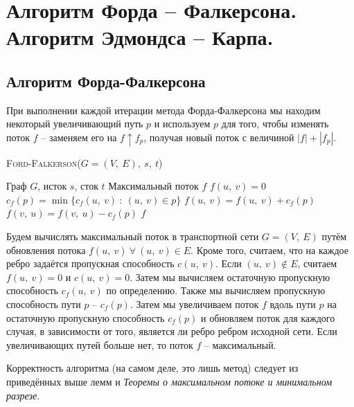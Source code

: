 \documentclass[a4paper,12pt]{article}
\newcommand{\algname}[1]{\textsc{#1}}
\begin{document}
\section{ Алгоритм Форда – Фалкерсона. Алгоритм Эдмондса – Карпа.}

\subsection{Алгоритм Форда-Фалкерсона}

При выполнении каждой итерации метода Форда-Фалкерсона мы находим некоторый увеличивающий путь $p$ и используем $p$ для того, чтобы изменять поток $f$ -- заменяем его на $f\uparrow f_p$, получая новый поток с величиной $|f| + |f_p|$.

\begin{algorithm}
  	\caption{\algname{Ford-Falkerson}($G = (V,\ E),\ s,\ t$)}
	\begin{algorithmic}
	    \Require Граф $G$, исток $s$, сток $t$
	    \Ensure Максимальный поток $f$
	    \State 
	        \State $f(u,\ v) = 0$
	    \EndFor
	        \State $c_f(p) = \min\{c_f(u,\ v)\ :\ (u,\ v) \in p\}$
	                \State $f(u,\ v) = f(u,\ v) + c_f(p)$
	            \Else
	                \State $f(v,\ u) = f(v,\ u) - c_f(p)$
	            \EndIf
	       \EndFor
	    \EndWhile
	    \State \Return $f$
	\end{algorithmic}
\end{algorithm}

Будем вычислять максимальный поток в транспортной сети $G = (V,\ E)$ путём обновления потока $f(u,\ v)\ \forall\ (u,\ v) \in E$. Кроме того, считаем, что на каждое ребро задаётся пропускная способность $c(u,\ v)$. Если $(u,\ v) \notin E$, считаем $f(u,\ v) = 0$ и $c(u,\ v) = 0$.  Затем мы вычисляем остаточную пропускную способность $c_f(u,\ v)$ по определению. Также мы вычисляем пропускную способность пути $p$ -- $c_f(p)$. Затем мы увеличиваем поток $f$ вдоль пути $p$ на остаточную пропускную способность $c_f(p)$ и обновляем поток для каждого случая, в зависимости от того, является ли ребро ребром исходной сети. Если увеличивающих путей больше нет, то поток $f$ -- максимальный.

Корректность алгоритма (на самом деле, это лишь метод) следует из приведённых выше лемм и \textit{Теоремы о максимальном потоке и минимальном разрезе}.
\end{document}
